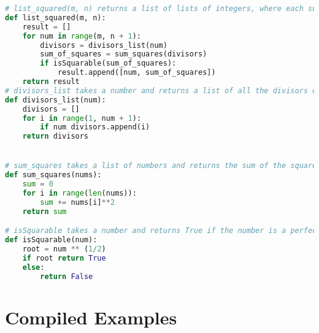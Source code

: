 \begin{figure*}
\begin{lstlisting}[language=Python]
# list_squared(m, n) returns a list of lists of integers, where each sublist contains an integer and its sum of squared divisors, and the integers are in the range [m, n] (inclusive).
def list_squared(m, n):
    result = []
    for num in range(m, n + 1):
        divisors = divisors_list(num)
        sum_of_squares = sum_squares(divisors)
        if isSquarable(sum_of_squares):
            result.append([num, sum_of_squares])
    return result
# divisors_list takes a number and returns a list of all the divisors of that number.
def divisors_list(num):
    divisors = []
    for i in range(1, num + 1):
        if num divisors.append(i)
    return divisors


# sum_squares takes a list of numbers and returns the sum of the squares of those numbers.
def sum_squares(nums):
    sum = 0
    for i in range(len(nums)):
        sum += nums[i]**2
    return sum

# isSquarable takes a number and returns True if the number is a perfect square, and False otherwise.
def isSquarable(num):
    root = num ** (1/2)
    if root return True
    else:
        return False
\end{lstlisting}
\caption{Train Problem 3393, Solution 35}
\end{figure*}


\clearpage
\newpage
\section{Compiled Examples}


